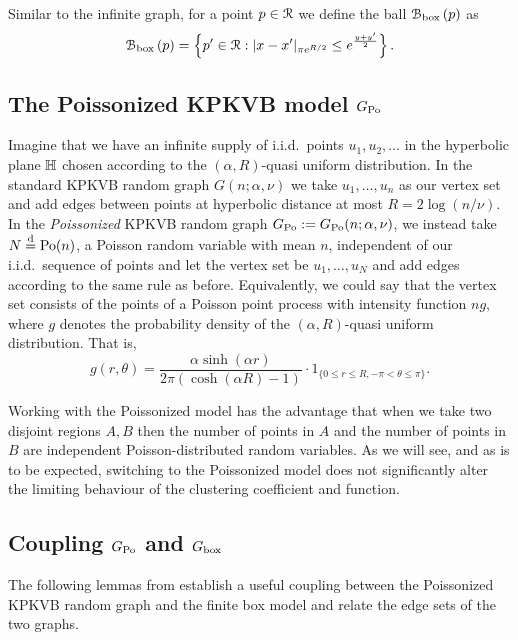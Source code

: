 Similar to the infinite graph, for a point $p \in {\mathcal R}$ we define the ball ${\mathcal B}_{\text{box}}\left(p\right)$ as
\begin{equation}\label{eq:def_ball_P_n}
	{\mathcal B}_{\text{box}}\left(p\right) = 
	\left\{p' \in {\mathcal R} : |x - x'|_{\pi e^{R/2}} \leq e^{\frac{y + y'}{2}}\right\}.
\end{equation}


\subsection{The Poissonized KPKVB model $G_{{\mathrm{Po}}}$}


Imagine that we have an infinite supply of i.i.d.~points $u_1, u_2, \dots$ in the hyperbolic plane ${\mathbb H}$ chosen according to the $(\alpha, R)$-quasi uniform distribution. In the standard KPKVB random graph $G(n;\alpha,\nu)$ we take $u_1,\dots, u_n$ as our vertex set and add edges between points at hyperbolic distance at most $R = 2\log(n/\nu)$. In the \emph{Poissonized} KPKVB random graph $G_{{\mathrm{Po}}} := G_{{\mathrm{Po}}}(n;\alpha,\nu)$, we instead take $N\stackrel{\text{d}}{=} {\mathrm{Po}}(n)$, a Poisson random variable 
with mean $n$, independent of our i.i.d.~sequence of points and let the vertex set be $u_1,\dots, u_N$ and add edges 
according to the same rule as before. Equivalently, we could say that the vertex set consists of the points of a Poisson point process with intensity function $n g$, where $g$ denotes the probability density of the $(\alpha,R)$-quasi uniform distribution. That is,
\begin{equation}\label{eq:def_quasi_uniform_density}
	g(r,\theta) = \frac{\alpha\sinh(\alpha r)}{2\pi(\cosh(\alpha R) - 1)} \cdot 1_{\{0\leq r\leq R, -\pi<\theta\leq \pi\}}.
\end{equation}

Working with the Poissonized model has the advantage that when we take two disjoint regions $A, B$ then the number of points in $A$ and the number of points  in $B$ are independent Poisson-distributed random variables. As we will see, and as is to be expected, switching to the Poissonized model does not significantly alter the limiting behaviour of the clustering coefficient and function.


\subsection{Coupling $G_{{\mathrm{Po}}}$ and $G_{\mathrm{box}}$\label{ssec:coupling_H_P}}


The following lemmas from \cite{fountoulakis2018law} establish a useful coupling between the Poissonized KPKVB random graph
and the finite box model and relate the edge  sets of the two graphs. 

